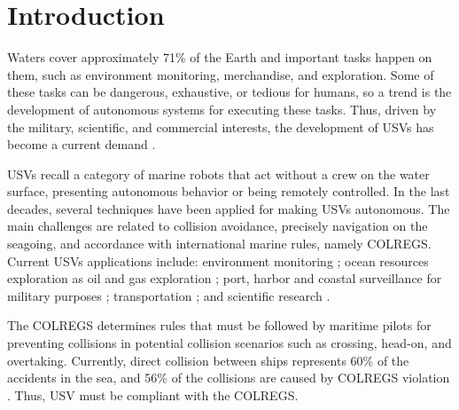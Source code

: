 \chapter{Introduction \label{chap:intro}}

    
    Waters cover approximately 71\% of the Earth and important tasks happen on them, such as environment monitoring, merchandise, and exploration. 
    Some of these tasks can be dangerous, exhaustive, or tedious for humans, so a trend is the development of autonomous systems for executing these tasks. Thus, driven by the military, scientific, and commercial interests, the development of \acp{USV} has become a current demand \cite{Liu2016Unmanned}.
    
    \acp{USV} recall a category of marine robots that act without a crew on the water surface, presenting autonomous behavior or being remotely controlled. In the last decades, several techniques have been applied for making \acp{USV} autonomous. The main challenges are related to collision avoidance, precisely navigation on the seagoing, and accordance with international marine rules, namely \ac{COLREGS}.
    Current \acp{USV} applications include: environment monitoring \cite{Caccia2005Sampling}; ocean resources exploration as oil and gas exploration \cite{Pastore2010Improving}; port, harbor and coastal surveillance for military purposes \cite{Caccia2007unmanned, Pastore2010Improving, Svec2011aAutomated}; transportation \cite{Kiencke2005Impact}; and scientific research \cite{Yan2010Development}.
    
    The \acs{COLREGS} determines rules that must be followed by maritime pilots for preventing collisions in potential collision scenarios such as crossing, head-on, and overtaking. Currently, direct collision between ships represents 60\% of the accidents in the sea, and 56\% of the collisions are caused by \acs{COLREGS} violation \cite{Liu2016Unmanned, Campbell2012Review_COLREGs}. Thus, \ac{USV} must be compliant with the \ac{COLREGS}.
    
